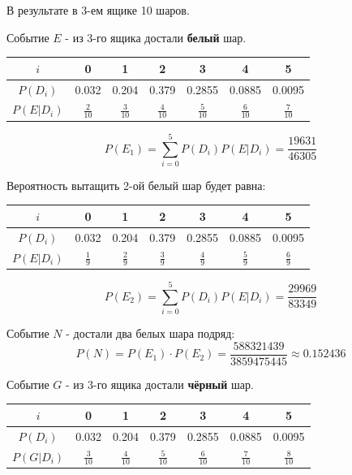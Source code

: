 \begin{enumerate}
	В результате в 3-ем ящике 10 шаров.
	
	Событие $E$ - из 3-го ящика достали \textbf{белый} шар.
	
	\begin{table}[H]
		\centering\makegapedcells
		\begin{tabular}{|c|c|c|c|c|c|c|}
			\hline
			$i$        & 0              & 1              & 2              & 3              & 4              & 5              \\ \hline
			$P(D_i)$   & 0.032          & 0.204          & 0.379          & 0.2855         & 0.0885         & 0.0095         \\ \hline
			$P(E|D_i)$ & $\frac{2}{10}$ & $\frac{3}{10}$ & $\frac{4}{10}$ & $\frac{5}{10}$ & $\frac{6}{10}$ & $\frac{7}{10}$ \\ \hline
		\end{tabular}
	\end{table}
	
	\[ P(E_1) = \sum_{i=0}^{5} P(D_i)P(E|D_i) = \dfrac{19631}{46305} \]
	
	Вероятность вытащить 2-ой белый шар будет равна:
	
	\begin{table}[H]
		\centering\makegapedcells
		\begin{tabular}{|c|c|c|c|c|c|c|}
			\hline
			$i$        & 0              & 1              & 2              & 3              & 4              & 5              \\ \hline
			$P(D_i)$   & 0.032          & 0.204          & 0.379          & 0.2855         & 0.0885         & 0.0095         \\ \hline
			$P(E|D_i)$ & $\frac{1}{9}$ & $\frac{2}{9}$ & $\frac{3}{9}$ & $\frac{4}{9}$ & $\frac{5}{9}$ & $\frac{6}{9}$ \\ \hline
		\end{tabular}
	\end{table}
	
	\[ P(E_2) = \sum_{i=0}^{5} P(D_i)P(E|D_i) = \dfrac{29969}{83349} \]
	
	Событие $N$ - достали два белых шара подряд:
	\[ P(N) = P(E_1) \cdot P(E_2) = \dfrac{588321439}{3859475445} \approx 0.152436 \]
	
	Событие $G$ - из 3-го ящика достали \textbf{чёрный} шар.
	
	\begin{table}[H]
		\centering\makegapedcells
		\begin{tabular}{|c|c|c|c|c|c|c|}
			\hline
			$i$        & 0              & 1              & 2              & 3              & 4              & 5              \\ \hline
			$P(D_i)$   & 0.032          & 0.204          & 0.379          & 0.2855         & 0.0885         & 0.0095         \\ \hline
			$P(G|D_i)$ & $\frac{3}{10}$ & $\frac{4}{10}$ & $\frac{5}{10}$ & $\frac{6}{10}$ & $\frac{7}{10}$ & $\frac{8}{10}$ \\ \hline
		\end{tabular}
	\end{table}
	

\end{enumerate}
